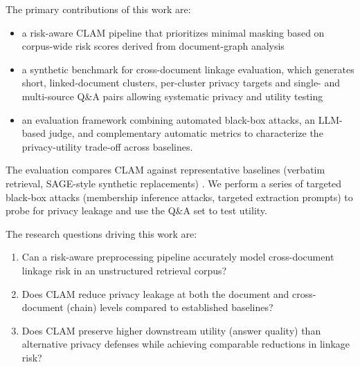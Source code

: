 The primary contributions of this work are:
\begin{itemize}
  \item a risk-aware CLAM pipeline that prioritizes minimal masking based on corpus-wide risk scores derived from document-graph analysis
  \item a synthetic benchmark for cross-document linkage evaluation, which generates short, linked-document clusters, per-cluster privacy targets and single- and multi-source Q\&A pairs allowing systematic privacy and utility testing
  \item an evaluation framework combining automated black-box attacks, an LLM-based judge, and complementary automatic metrics to characterize the privacy-utility trade-off across baselines.
\end{itemize}

The evaluation compares CLAM against representative baselines (verbatim retrieval, SAGE-style synthetic replacements) \cite{ragSAGE}. We perform a series of targeted black-box attacks (membership inference attacks, targeted extraction prompts) to probe for privacy leakage and use the Q\&A set to test utility.

The research questions driving this work are:
\begin{enumerate}
  \item Can a risk-aware preprocessing pipeline accurately model cross-document linkage risk in an unstructured retrieval corpus?
  \item Does CLAM reduce privacy leakage at both the document and cross-document (chain) levels compared to established baselines?
  \item Does CLAM preserve higher downstream utility (answer quality) than alternative privacy defenses while achieving comparable reductions in linkage risk?
\end{enumerate}



